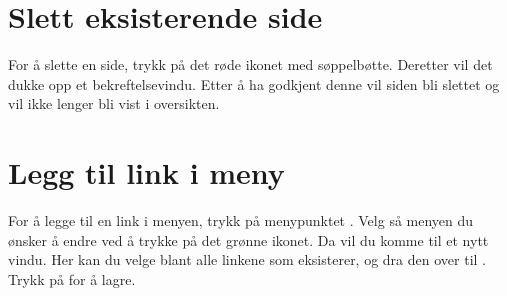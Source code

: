 \begin{figure}[H]
    \centering
    \label{fig:cms-edit-information}
\end{figure}

\section{Slett eksisterende side}
For å slette en side, trykk på det røde ikonet med søppelbøtte. Deretter vil det dukke opp et bekreftelsevindu. Etter å ha godkjent denne vil siden bli slettet og vil ikke lenger bli vist i oversikten.

\begin{figure}[H]
    \centering
    \label{fig:cms-delete-page}
\end{figure}


\section{Legg til link i meny}
For å legge til en link i menyen, trykk på menypunktet . Velg så menyen du ønsker å endre ved å trykke på det grønne ikonet. Da vil du komme til et nytt vindu. Her kan du velge blant alle linkene som eksisterer, og dra den over til . Trykk på  for å lagre.

\begin{figure}[H]
    \centering
    \label{fig:cms-menu}
\end{figure}

